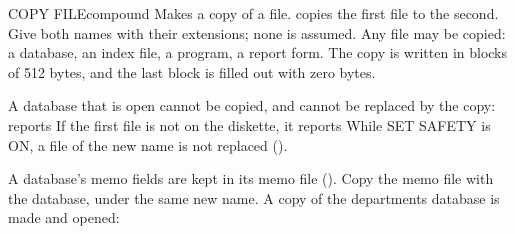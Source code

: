 \begin{XbaseEntry}{COPY FILE}{compound}%
Makes a copy of a file.
\Syntax
{}
\Usage
{} copies the first file to the second.  Give both names with
their extensions; none is assumed.  Any file may be copied: a database, an
index file, a program, a report form.  The copy is written in blocks of 512
bytes, and the last block is filled out with zero bytes.

A database that is open cannot be copied, and cannot be replaced by the copy:
 reports   If the first file is
not on the diskette, it reports   While SET
SAFETY is ON, a file of the new name is not replaced
().

A database's memo fields are kept in its memo file ().  Copy the
memo file with the database, under the same new name.
\Examples
A copy of the departments database is made and opened:
\end{XbaseEntry}

